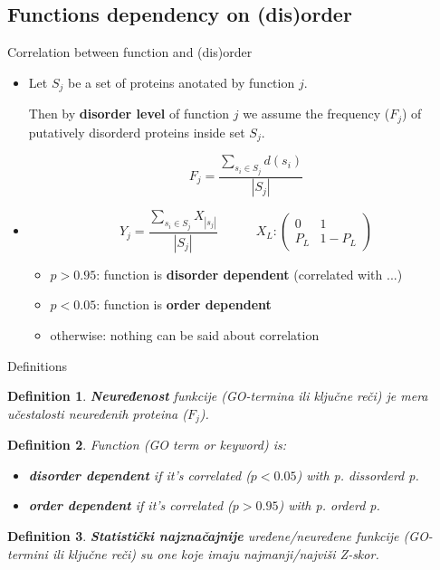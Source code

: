 \documentclass{beamer}
\newcommand{\keyword}[1]{\textbf{#1}}
\newtheorem{definicija}{Definition}
\begin{document}
\subsection{Functions dependency on (dis)order}
\begin{frame}{Correlation between function and (dis)order}

  \begin{itemize}
    \item 
      Let $S_j$ be a set of proteins anotated by function $j$.

      Then by \keyword{disorder level} of function $j$ we assume the frequency
      ($F_j$) of putatively disorderd proteins inside set $S_j$.

      $$F_j = \dfrac{\sum_{s_i \in S_j} d(s_i)} {|S_j|} $$

      \pause

    \item
      $$
      Y_j = \dfrac {\sum_{s_i \in S_j} {X_{|s_j|}}}{|S_j|}
      \quad \quad \quad
    X_L : \begin{pmatrix} 0 & 1\\ P_L & 1-P_L \end{pmatrix}
      $$

      \pause

      \begin{itemize}
        \item $p>0.95$: function is \keyword{disorder dependent}
          (correlated with ...)
        \item $p<0.05$: function is \keyword{order dependent}
        \item otherwise: nothing can be said about correlation
      \end{itemize}


  \end{itemize}

\end{frame}

\begin{frame}{Definitions}
  \pause
  \begin{definicija}
    \keyword{Neuređenost} funkcije (GO-termina ili ključne reči) je mera učestalosti
    neuređenih proteina ($F_j$).
  \end{definicija}
      \pause
  \begin{definicija}
    Function (GO term or keyword) is:
    \begin{itemize}
      \item \keyword{disorder dependent} if it's  correlated ($p<0.05$) with p.
        dissorderd p.
      \item \keyword{order dependent} if it's  correlated ($p>0.95$) with p.
        orderd p.
    \end{itemize}
  \end{definicija}
      \pause
  \begin{definicija}
    \keyword{Statistički najznačajnije} uređene/neuređene funkcije
    (GO-termini ili ključne reči) su one koje imaju najmanji/najviši Z-skor.
  \end{definicija}
\end{frame}
\end{document}
